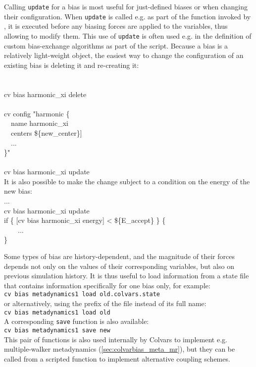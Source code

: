 {Calling \texttt{update} for a bias is most useful for just-defined biases or when changing their configuration.
When \texttt{update} is called e.g.{} as part of the function invoked by , it is executed before any biasing forces are applied to the variables, thus allowing to modify them.
This use of \texttt{update} is often used e.g.{} in the definition of custom bias-exchange algorithms as part of the \MDENGINE{} script.
Because a bias is a relatively light-weight object, the easiest way to change the configuration of an existing bias is deleting it and re-creating it:\\
{\noindent\ttfamily\\
\\
\-cv bias harmonic\_xi delete\\
\\
\-cv config "harmonic \{\\
\-~~name harmonic\_xi\\
\-~~centers \$\{new\_center\}]\\
\-~~...\\
\-\}"\\
\\
\-cv bias harmonic\_xi update\\
}
It is also possible to make the change subject to a condition on the energy of the new bias:
{\noindent\ttfamily\\
  \-...\\
  \-cv bias harmonic\_xi update\\
  \-if \{ [cv bias harmonic\_xi energy] < \$\{E\_accept\} \} \{\\
  \-~~~~...\\
  \-\}\\
}


Some types of bias are history-dependent, and the magnitude of their forces depends not only on the values of their corresponding variables, but also on previous simulation history.
It is thus useful to load information from a state file that contains information specifically for one bias only, for example:\\
\noindent\texttt{cv bias metadynamics1 load old.colvars.state}\\
\noindent{}or alternatively, using the prefix of the file instead of its full name:\\
\noindent\texttt{cv bias metadynamics1 load old}\\
A corresponding \texttt{save} function is also available:\\
\noindent\texttt{cv bias metadynamics1 save new}\\
This pair of functions is also used internally by Colvars to implement e.g.{} multiple-walker metadynamics (\ref{sec:colvarbias_meta_mr}), but they can be called from a scripted function to implement alternative coupling schemes.

}
